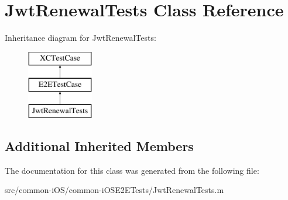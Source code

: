 \hypertarget{interface_jwt_renewal_tests}{}\section{Jwt\+Renewal\+Tests Class Reference}
\label{interface_jwt_renewal_tests}
Inheritance diagram for Jwt\+Renewal\+Tests\+:\begin{figure}[H]
\begin{center}
\leavevmode
\includegraphics[height=3.000000cm]{interface_jwt_renewal_tests}
\end{center}
\end{figure}
\subsection*{Additional Inherited Members}


The documentation for this class was generated from the following file\+:\begin{DoxyCompactItemize}
\item 
src/common-\/i\+O\+S/common-\/i\+O\+S\+E2\+E\+Tests/Jwt\+Renewal\+Tests.\+m\end{DoxyCompactItemize}

